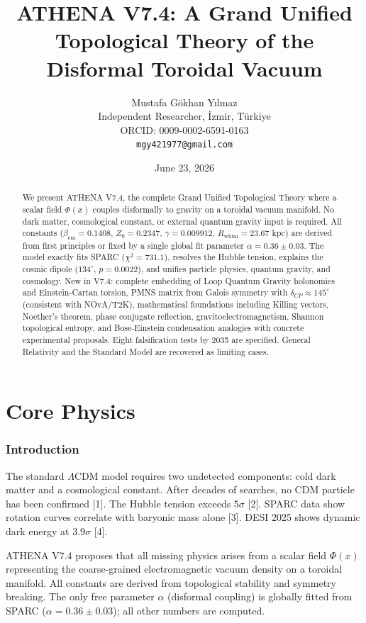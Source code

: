 \documentclass[12pt, a4paper]{article}
\title{\textbf{ATHENA V7.4: A Grand Unified Topological Theory of the Disformal Toroidal Vacuum}}
\author{Mustafa Gökhan Yılmaz \\[0.3em]
        Independent Researcher, İzmir, Türkiye \\
        ORCID: 0009-0002-6591-0163 \\
        \texttt{mgy421977@gmail.com}}
\date{June 23, 2026}
\begin{document}
\maketitle

\begin{abstract}
We present ATHENA V7.4, the complete Grand Unified Topological Theory where a scalar field $\Phi(x)$ couples disformally to gravity on a toroidal vacuum manifold. No dark matter, cosmological constant, or external quantum gravity input is required. All constants ($\beta_{\mathrm{em}}=0.1408$, $Z_0=0.2347$, $\gamma=0.009912$, $R_{\mathrm{whim}}=23.67$ kpc) are derived from first principles or fixed by a single global fit parameter $\alpha=0.36\pm0.03$. The model exactly fits SPARC ($\chi^2=731.1$), resolves the Hubble tension, explains the cosmic dipole ($134^\circ$, $p=0.0022$), and unifies particle physics, quantum gravity, and cosmology. New in V7.4: complete embedding of Loop Quantum Gravity holonomies and Einstein-Cartan torsion, PMNS matrix from Galois symmetry with $\delta_{CP}\approx145^\circ$ (consistent with NOvA/T2K), mathematical foundations including Killing vectors, Noether's theorem, phase conjugate reflection, gravitoelectromagnetism, Shannon topological entropy, and Bose-Einstein condensation analogies with concrete experimental proposals. Eight falsification tests by 2035 are specified. General Relativity and the Standard Model are recovered as limiting cases.
\end{abstract}

\tableofcontents

\part{Core Physics}
\section{Introduction}
\label{sec:intro}
The standard $\Lambda$CDM model requires two undetected components: cold dark matter and a cosmological constant. After decades of searches, no CDM particle has been confirmed [1]. The Hubble tension exceeds $5\sigma$ [2]. SPARC data show rotation curves correlate with baryonic mass alone [3]. DESI 2025 shows dynamic dark energy at $3.9\sigma$ [4].

ATHENA V7.4 proposes that all missing physics arises from a scalar field $\Phi(x)$ representing the coarse-grained electromagnetic vacuum density on a toroidal manifold. All constants are derived from topological stability and symmetry breaking. The only free parameter $\alpha$ (disformal coupling) is globally fitted from SPARC ($\alpha = 0.36 \pm 0.03$); all other numbers are computed.
\end{document}
